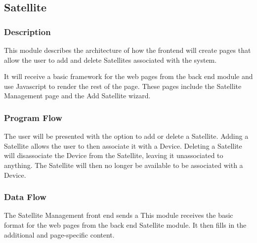 
\subsection{Satellite}

\subsubsection{Description}

This module describes the architecture of how the frontend will create pages that allow the user to add and delete Satellites associated with the system. 

It will receive a basic framework for the web pages from the back end module and use Javascript to render the rest of the page. 
These pages include the Satellite Management page and the Add Satellite wizard. 

\subsubsection{Program Flow}

The user will be presented with the option to add or delete a Satellite. 
Adding a Satellite allows the user to then associate it with a Device. 
Deleting a Satellite will disassociate the Device from the Satellite, leaving it unassociated to anything. 
The Satellite will then no longer be available to be associated with a Device. 

\subsubsection{Data Flow}

The Satellite Management front end sends a 
This module receives the basic format for the web pages from the back end Satellite module. 
It then fills in the additional and page-specific content. 


